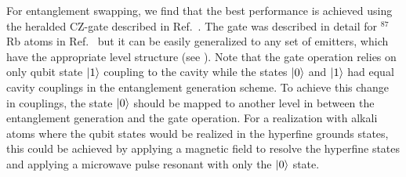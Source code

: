 For entanglement swapping, we find that the best performance is achieved using
the heralded CZ-gate described in Ref.~\cite{Borregaard2015a}. The gate was described
in detail for ${}^{87}$Rb atoms in Ref.~\cite{Borregaard2015a} but it can be easily
generalized to any set of emitters, which have the appropriate level structure
(see ). Note that the gate operation relies on only qubit
state $| 1 \rangle$ coupling to the cavity while the states $| 0 \rangle$ and $| 1 \rangle$
had equal cavity couplings in the entanglement generation scheme. To achieve
this change in couplings, the state $| 0 \rangle$ should be mapped to another level
in between the entanglement generation and the gate operation. For a realization
with alkali atoms where the qubit states would be realized in the hyperfine
grounds states, this could be achieved by applying a magnetic field to resolve
the hyperfine states and applying a microwave pulse resonant with only the
$| 0 \rangle$ state.
